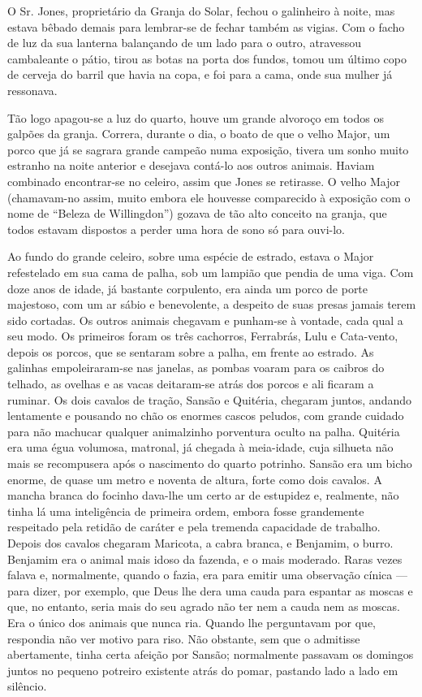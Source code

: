 O Sr. Jones, proprietário da Granja do Solar, fechou o galinheiro à noite, mas estava bêbado demais para lembrar-se de fechar também as vigias. Com o facho de luz da sua lanterna balançando de um lado para o outro, atravessou cambaleante o pátio, tirou as botas na porta dos fundos, tomou um último copo de cerveja do barril que havia na copa, e foi para a cama, onde sua mulher já ressonava.

Tão logo apagou-se a luz do quarto, houve um grande alvoroço em todos os galpões da granja. Correra, durante o dia, o boato de que o velho Major, um porco que já se sagrara grande campeão numa exposição, tivera um sonho muito estranho na noite anterior e desejava contá-lo aos outros animais. Haviam combinado encontrar-se no celeiro, assim que Jones se retirasse. O velho Major (chamavam-no assim, muito embora ele houvesse comparecido à exposição com o nome de ``Beleza de Willingdon'') gozava de tão alto conceito na granja, que todos estavam dispostos a perder uma hora de sono só para ouvi-lo.

Ao fundo do grande celeiro, sobre uma espécie de estrado, estava o Major refestelado em sua cama de palha, sob um lampião que pendia de uma viga. Com doze anos de idade, já bastante corpulento, era ainda um porco de porte majestoso, com um ar sábio e benevolente, a despeito de suas presas jamais terem sido cortadas. Os outros animais chegavam e punham-se à vontade, cada qual a seu modo. Os primeiros foram os três cachorros, Ferrabrás, Lulu e Cata-vento, depois os porcos, que se sentaram sobre a palha, em frente ao estrado. As galinhas empoleiraram-se nas janelas, as pombas voaram para os caibros do telhado, as ovelhas e as vacas deitaram-se atrás dos porcos e ali ficaram a ruminar. Os dois cavalos de tração, Sansão e Quitéria, chegaram juntos, andando lentamente e pousando no chão os enormes cascos peludos, com grande cuidado para não machucar qualquer animalzinho porventura oculto na palha. Quitéria era uma égua volumosa, matronal, já chegada à meia-idade, cuja silhueta não mais se recompusera após o nascimento do quarto potrinho. Sansão era um bicho enorme, de quase um metro e noventa de altura, forte como dois cavalos. A mancha branca do focinho dava-lhe um certo ar de estupidez e, realmente, não tinha lá uma inteligência de primeira ordem, embora fosse grandemente respeitado pela retidão de caráter e pela tremenda capacidade de trabalho. Depois dos cavalos chegaram Maricota, a cabra branca, e Benjamim, o burro. Benjamim era o animal mais idoso da fazenda, e o mais moderado. Raras vezes falava e, normalmente, quando o fazia, era para emitir uma observação cínica --- para dizer, por exemplo, que Deus lhe dera uma cauda para espantar as moscas e que, no entanto, seria mais do seu agrado não ter nem a cauda nem as moscas. Era o único dos animais que nunca ria. Quando lhe perguntavam por que, respondia não ver motivo para riso. Não obstante, sem que o admitisse abertamente, tinha certa afeição por Sansão; normalmente passavam os domingos juntos no pequeno potreiro existente atrás do pomar, pastando lado a lado em silêncio.

